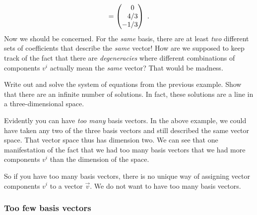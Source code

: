 \begin{example}
\begin{align}
    =
    \begin{pmatrix}
        \pp 0 \\ \pp 4/3 \\ - 1/3
    \end{pmatrix} \ .
\end{align}
Now we should be concerned. For the \emph{same} basis, there are at least \emph{two} different sets of coefficients that describe the \emph{same} vector! How are we supposed to keep track of the fact that there are \emph{degeneracies} where different combinations of components $v^i$ actually mean the \emph{same} vector? That would be madness.\sidenotemark
\end{example}
\begin{exercise}
Write out and solve the system of equations from the previous example. Show that there are an infinite number of solutions. In fact, these solutions are a line in a three-dimensional space.
\end{exercise}

Evidently you can have \emph{too many} basis vectors. In the above example, we could have taken any two of the three basis vectors and still described the same vector space. That vector space thus has dimension two. We can see that one manifestation of the fact that we had too many basis vectors that we had more components $v^i$ than the dimension of the space.

So if you have too many basis vectors, there is no unique way of assigning vector components $v^i$ to a vector $\vec{v}$. We do not want to have too many basis vectors. 


\subsubsection{Too few basis vectors}


